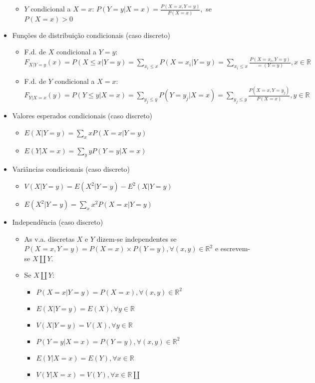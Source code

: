 \documentclass[a4paper]{report}
\begin{document}
\begin{itemize}
\begin{itemize}
			\item $Y$ condicional a $X=x$: $P(Y=y|X=x)=\frac{P(X=x,Y=y)}{P(X=x)},$ se $P(X=x)>0$
		\end{itemize}
		\item Funções de distribuição condicionais (caso discreto)
		\begin{itemize}
			\item F.d. de $X$ condicional a $Y=y$: $F_{X|Y=y}(x)=P(X\leq x|Y=y)=\sum_{x_i\leq x} P(X=x_i|Y=y)=\sum_{x_i\leq x} \frac{P(X=x_i,Y=y)}{=(Y=y)},x\in\mathbb R$
			\item F.d. de $Y$ condicional a $X=x$: $F_{Y|X=x}(y)=P(Y\leq y|X=x)=\sum_{y_j\leq y} P(Y=y_j|X=x)=\sum_{y_j\leq y} \frac{P(X=x,Y=y_j)}{P(X=x)},y\in\mathbb R$
		\end{itemize}
		\item Valores esperados condicionais (caso discreto)
		\begin{itemize}
			\item $E(X|Y=y)=\sum_x xP(X=x|Y=y)$
			\item $E(Y|X=x)=\sum_y yP(Y=y|X=x)$
		\end{itemize}
		\item Variâncias condicionais (caso discreto)
		\begin{itemize}
			\item $V(X|Y=y)=E(X^2|Y=y)-E^2(X|Y=y)$
			\item $E(X^2|Y=y)=\sum_x x^2P(X=x|Y=y)$
		\end{itemize}
		\item Independência (caso discreto)
			\begin{itemize}
				\item As v.a. discretas $X$ e $Y$ dizem-se independentes se $P(X=x,Y=y)=P(X=x)\times P(Y=y),\forall (x,y)\in\mathbb R^2$ e escrevem-se $X\amalg Y$.
				\item Se $X\amalg Y$:
				\begin{itemize}
					\item $P(X=x|Y=y)=P(X=x),\forall(x,y)\in\mathbb R^2$
					\item $E(X|Y=y)=E(X),\forall y\in\mathbb R$
					\item $V(X|Y=y)=V(X),\forall y\in\mathbb R$
					\item $P(Y=y|X=x)=P(Y=y),\forall (x,y)\in\mathbb R^2$
					\item $E(Y|X=x)=E(Y),\forall x\in\mathbb R$
					\item $V(Y|X=x)=V(Y),\forall x\in\mathbb R \amalg $
				\end{itemize}

\end{itemize}
\end{itemize}
\end{document}
